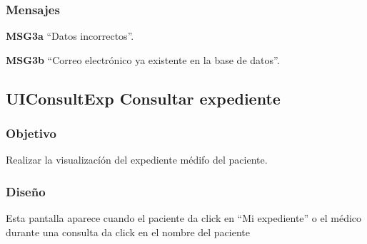 \subsubsection{Mensajes}
    \begin{Citemize}
        \item {\bf MSG3a} “Datos incorrectos”.
        \item {\bf MSG3b} “Correo electrónico ya existente en la base de datos”.
    \end{Citemize}




\subsection{UIConsultExp Consultar expediente}

\subsubsection{Objetivo}
    Realizar la visualizacíón del expediente médifo del paciente. 

\subsubsection{Diseño}
   Esta pantalla aparece cuando el paciente da click en ``Mi expediente'' o el médico durante una consulta da click 
   en el nombre del paciente 

